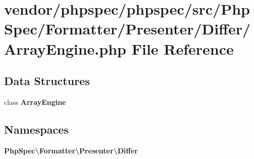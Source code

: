\section{vendor/phpspec/phpspec/src/\+Php\+Spec/\+Formatter/\+Presenter/\+Differ/\+Array\+Engine.php File Reference}
\label{_array_engine_8php}
\subsection*{Data Structures}
\begin{DoxyCompactItemize}
\item 
class {\bf Array\+Engine}
\end{DoxyCompactItemize}
\subsection*{Namespaces}
\begin{DoxyCompactItemize}
\item 
 {\bf Php\+Spec\textbackslash{}\+Formatter\textbackslash{}\+Presenter\textbackslash{}\+Differ}
\end{DoxyCompactItemize}
